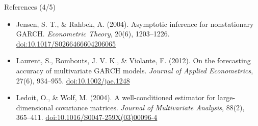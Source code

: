 \begin{frame}{References (4/5)}
\begin{itemize}
    \item Jensen, S. T., \& Rahbek, A. (2004). Asymptotic inference for nonstationary GARCH. \textit{Econometric Theory}, 20(6), 1203--1226. \href{https://doi.org/10.1017/S0266466604206065}{doi:10.1017/S0266466604206065}
    \item Laurent, S., Rombouts, J. V. K., \& Violante, F. (2012). On the forecasting accuracy of multivariate GARCH models. \textit{Journal of Applied Econometrics}, 27(6), 934--955. \href{https://doi.org/10.1002/jae.1248}{doi:10.1002/jae.1248}
    \item Ledoit, O., \& Wolf, M. (2004). A well-conditioned estimator for large-dimensional covariance matrices. \textit{Journal of Multivariate Analysis}, 88(2), 365--411. \href{https://doi.org/10.1016/S0047-259X(03)00096-4}{doi:10.1016/S0047-259X(03)00096-4}
\end{itemize}
\end{frame}

